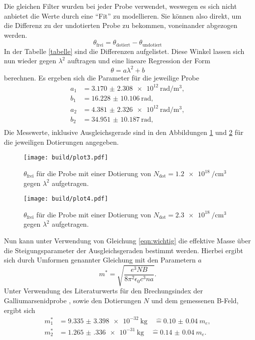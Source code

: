 Die gleichen Filter wurden bei jeder Probe verwendet, weswegen es sich nicht anbietet die Werte durch eine \enquote{Fit} zu modellieren.
Sie können also direkt, um die Differenz zu der undotierten Probe zu bekommen, voneinander abgezogen werden.
\begin{equation}
\theta_{\text{frei}} = \theta_{\text{dotiert}} - \theta_{\text{undotiert}}
\end{equation}
In der Tabelle \ref{tabelle} sind die Differenzen aufgelistet. Diese Winkel lassen sich nun wieder gegen $\lambda^2$ auftragen und eine lineare Regression
der Form
\begin{equation}
\theta = a \lambda^2 + b
\end{equation}
berechnen.
Es ergeben sich die Parameter für die jeweilige Probe
\begin{align*}
a_{1} &= \SI{3.170(2308)e12}{\radian\per\meter\tothe{3}},\\
b_{1} &= \SI{16.228(10106)}{\radian}, \\
a_{2} &= \SI{4.381(2326)e12}{\radian\per\meter\tothe{3}},\\
b_{2} &= \SI{34.951(10187)}{\radian}, \\
\end{align*}
Die Messwerte, inklusive Ausgleichsgerade sind in den Abbildungen \ref{plt1} und \ref{plt2} für die jeweiligen Dotierungen angegeben.
\begin{figure}
    \centering
    \texttt{[image: build/plot3.pdf]}
    \caption{$\theta_{\text{frei}}$ für die Probe mit einer Dotierung von $N_{\text{dot}}=\SI{1.2e18}{\per\centi\meter\tothe{3}}$ gegen $\lambda^2$ aufgetragen.}
    \label{plt1}
\end{figure}
\begin{figure}
    \centering
    \texttt{[image: build/plot4.pdf]}
    \caption{$\theta_{\text{frei}}$ für die Probe mit einer Dotierung von $N_{\text{dot}}=\SI{2.3e18}{\per\centi\meter\tothe{3}}$ gegen $\lambda^2$ aufgetragen.}
    \label{plt2}
\end{figure}
Nun kann unter Verwendung von Gleichung \eqref{eqn:wichtig} die effektive Masse über die Steigungsparameter der Ausgleichsgeraden bestimmt werden.
Hierbei ergibt sich durch Umformen genannter Gleichung mit den Parametern $a$
\begin{equation}
m^{*} = \sqrt{\frac{e^3 NB}{8 \pi^2 \epsilon_0 c^3 n a}}.
\end{equation}
Unter Verwendung des Literaturwerts für den Brechungsindex der Galliumarsenidprobe \cite{GaAs}, sowie den Dotierungen $N$ und dem gemessenen B-Feld, ergibt sich
\begin{align}
m_1^{*} &= \SI{9.335(3398)e-32}{\kilo\gram} \quad \hat{=} \SI{0.10(4)}{}m_e,\\
m_2^{*} &= \SI{1.265(336)e-31}{\kilo\gram} \quad \hat{=} \SI{0.14(4)}{}m_e.
\end{align}
